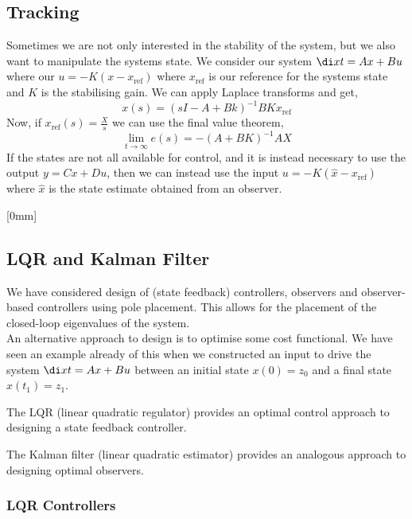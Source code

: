 \subsection{Tracking}
Sometimes we are not only interested in the stability of the system, but we also want to manipulate the systems state. We consider our system $\di x t = Ax + Bu$ where our $u = -K(x - x_{\text{ref}})$ where $x_{\text{ref}}$ is our reference for the systems state and $K$ is the stabilising gain. We can apply Laplace transforms and get,
$$ x(s) = (sI - A + Bk)^{-1}BKx_{\text{ref}} $$
Now, if $x_{\text{ref}}(s) = \frac{X}{s}$ we can use the final value theorem,
$$ \lim_{t \to \infty} e(s) = -(A + BK)^{-1}AX $$
If the states are not all available for control, and it is instead necessary to use the output $y = Cx + Du$, then we can instead use the input $u = -K(\hat x - x_{\text{ref}} )$ where $\hat x$ is the state estimate obtained from an observer.

[0mm]
\subsection{LQR and Kalman Filter}
We have considered design of (state feedback) controllers,
observers and observer-based controllers using pole placement.
This allows for the placement of the closed-loop eigenvalues of the system.\\

\noindent
An alternative approach to design is to optimise some cost
functional. We have seen an example already of this when we
constructed an input to drive the system $\di x t = Ax + Bu$ between an initial state $x(0) = z_0$ and a final state $x(t_1) = z_1$.\\

\begin{ndefi}[LQR]
  The LQR (linear quadratic regulator) provides an optimal control approach to designing a state feedback controller.
\end{ndefi}

\begin{ndefi}
  The Kalman filter (linear quadratic estimator) provides an analogous approach to designing optimal observers.
\end{ndefi}

\subsubsection{LQR Controllers}


